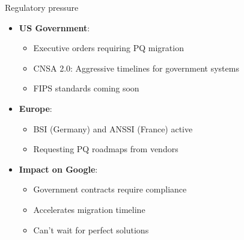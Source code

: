 \documentclass[aspectratio=169, lualatex, handout]{beamer}
\begin{document}
\begin{frame}{Regulatory pressure}
	\begin{itemize}
		\item \textbf{US Government}:
		      \begin{itemize}
			      \item Executive orders requiring PQ migration
			      \item CNSA 2.0: Aggressive timelines for government systems
			      \item FIPS standards coming soon
		      \end{itemize}
		\item \textbf{Europe}:
		      \begin{itemize}
			      \item BSI (Germany) and ANSSI (France) active
			      \item Requesting PQ roadmaps from vendors
		      \end{itemize}
		\item \textbf{Impact on Google}:
		      \begin{itemize}
			      \item Government contracts require compliance
			      \item Accelerates migration timeline
			      \item Can't wait for perfect solutions
		      \end{itemize}
	\end{itemize}
\end{frame}
\end{document}
